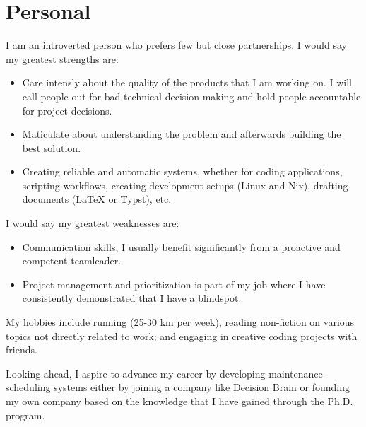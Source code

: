 \section{Personal}

I am an introverted person who prefers few but close partnerships. I would say my greatest strengths are:
\begin{itemize}
	\item Care intensly about the quality of the products that I am working on. I will call people out for bad technical decision making and hold people accountable for project decisions.
	\item Maticulate about understanding the problem and afterwards building the best solution.
	\item Creating reliable and automatic systems, whether for coding applications, scripting workflows, creating development setups (Linux and Nix), drafting documents (LaTeX or Typst), etc.
\end{itemize}

I would say my greatest weaknesses are:
\begin{itemize}
	\item Communication skills, I usually benefit significantly from a proactive and competent teamleader.
	\item Project management and prioritization is part of my job where I have consistently demonstrated that I have a blindspot.  
\end{itemize}
 
My hobbies include running (25-30 km per week), reading non-fiction on various topics not directly related to work; 
and engaging in creative coding projects with friends.

Looking ahead, I aspire to advance my career by developing maintenance scheduling systems
either by joining a company like Decision Brain or founding my own company based on the
knowledge that I have gained through the Ph.D. program.
